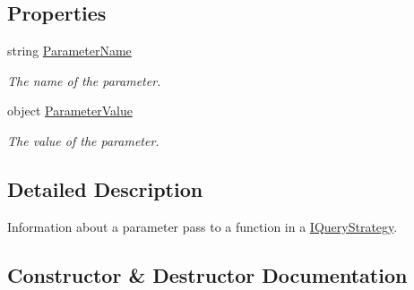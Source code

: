 \subsection*{Properties}
\begin{DoxyCompactItemize}
\item 
string \hyperlink{classCqrs_1_1Repositories_1_1Queries_1_1QueryParameter_a9e2242ad5acffe4e99d4945e4b88be8d_a9e2242ad5acffe4e99d4945e4b88be8d}{Parameter\+Name}
\begin{DoxyCompactList}\small\item\em The name of the parameter. \end{DoxyCompactList}\item 
object \hyperlink{classCqrs_1_1Repositories_1_1Queries_1_1QueryParameter_a0d1c69ffc864aeda2eb515a9e57fbd7a_a0d1c69ffc864aeda2eb515a9e57fbd7a}{Parameter\+Value}
\begin{DoxyCompactList}\small\item\em The value of the parameter. \end{DoxyCompactList}\end{DoxyCompactItemize}


\subsection{Detailed Description}
Information about a parameter pass to a function in a \hyperlink{interfaceCqrs_1_1Repositories_1_1Queries_1_1IQueryStrategy}{I\+Query\+Strategy}. 



\subsection{Constructor \& Destructor Documentation}
\mbox{\label{classCqrs_1_1Repositories_1_1Queries_1_1QueryParameter_abf7919fe1130356255ba0b5c4b4f470a_abf7919fe1130356255ba0b5c4b4f470a}} 
